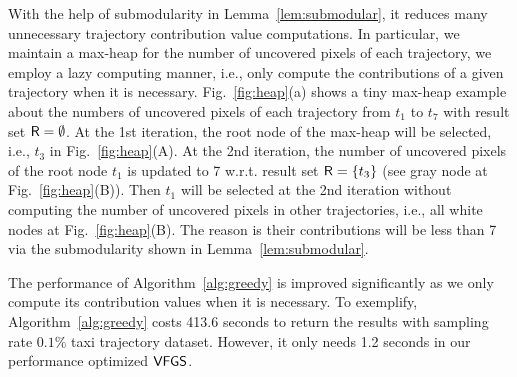 With the help of submodularity in Lemma~\ref{lem:submodular}, it reduces many unnecessary trajectory contribution value computations.
In particular, we maintain a max-heap for the number of uncovered pixels of each trajectory,
we employ a lazy computing manner, i.e., only compute the contributions of a given trajectory when it is necessary.
Fig.~\ref{fig:heap}(a) shows a tiny max-heap example about the numbers of uncovered pixels of each trajectory from $t_1$ to $t_7$ with result set $\mathsf{R}=\emptyset$.
At the 1st iteration, the root node of the max-heap will be selected, i.e., $t_3$ in Fig.~\ref{fig:heap}(A).
At the 2nd iteration, the number of uncovered pixels of the root node $t_1$ is updated to 7 w.r.t. result set $\mathsf{R} = \{t_3 \}$ (see gray node at Fig.~\ref{fig:heap}(B)).
Then $t_1$ will be selected at the 2nd iteration without computing the number of uncovered pixels in other trajectories, i.e., all white nodes at Fig.~\ref{fig:heap}(B).
The reason is their contributions will be less than 7 via the submodularity shown in Lemma~\ref{lem:submodular}.


%
%
The performance of Algorithm~\ref{alg:greedy} is improved significantly as we only compute its contribution values when it is necessary.
To exemplify, Algorithm~\ref{alg:greedy} costs 413.6 seconds to return the results with sampling rate $0.1\%$ \pt{} taxi trajectory dataset.
However, it only needs 1.2 seconds in our performance optimized $\mathsf{VFGS}$.



